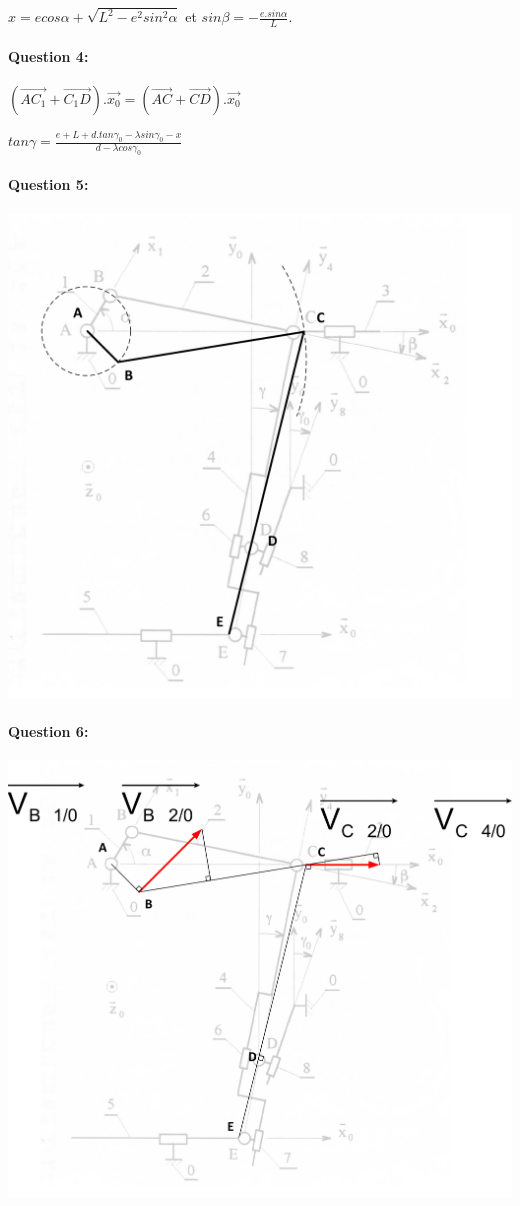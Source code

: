 $x=e cos\alpha + \sqrt{L^2-e^2 sin^2 \alpha}$ et $sin\beta = -\frac{e.sin\alpha}{L}$.

\paragraph{Question 4:} $(\overrightarrow{AC_1}+\overrightarrow{C_1D}).\overrightarrow{x_0}=(\overrightarrow{AC}+\overrightarrow{CD}).\overrightarrow{x_0}$

$tan\gamma=\frac{e+L+d.tan\gamma_0-\lambda sin\gamma_0 -x}{d-\lambda cos\gamma_0}$

\paragraph{Question 5:} 

\begin{center}
 \includegraphics[width=0.8\linewidth]{img/epure_cor}
\end{center}

\paragraph{Question 6:} 

\begin{center}
 \includegraphics[width=0.8\linewidth]{img/reglage_cor_cin_1}
\end{center}

